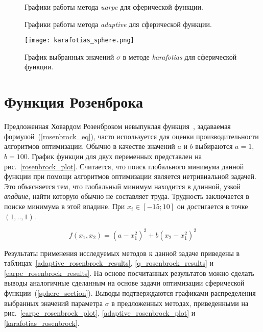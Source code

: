 \begin{figure}
  \centering
  \caption{ Графики работы метода \textit{uarpc} для сферической функции.}
  \label{uarpc_sphere_plot}
\end{figure}

\begin{figure}
  \centering
  \caption{ Графики работы метода \textit{adaptive} для сферической функции.}
  \label{adaptive_sphere_plot}
\end{figure}

\begin{figure}
  \centering
  \texttt{[image: karafotias\_sphere.png]}
  \caption{График выбранных значений $\sigma$ в методе \textit{karafotias} для сферической функции.}
  \label{karafotias_sphere}
\end{figure}


\section{Функция Розенброка}

Предложенная Ховардом Розенброком невыпуклая функция~\cite{rosenbrock}, задаваемая формулой~(\ref{rosenbrock_eq}), часто используется для оценки производительности алгоритмов оптимизации. Обычно в качестве значений $a$ и $b$ выбираются $a = 1$, $b = 100$. График функции для двух переменных представлен на рис.~\ref{rosenbrock_plot}. Считается, что поиск глобального минимума данной функции при помощи алгоритмов оптимизации является нетривиальной задачей. Это объясняется тем, что глобальный минимум находится в длинной, узкой \textit{впадине}, найти которую обычно не составляет труда. Трудность заключается в поиске минимума в этой впадине. При $x_i \in [-15; 10]$ он достигается в точке $(1,..,1)$.

\begin{equation}
\label{rosenbrock_eq}
f(x_1, x_2) = (a - x_1^2)^2 + b(x_2 - x_1^2)^2
\end{equation}

Результаты применения исследуемых методов к данной задаче приведены в таблицах~\ref{adaptive_rosenbrock_results}, \ref{q_rosenbrock_results} и \ref{earpc_rosenbrock_results}. На основе посчитанных результатов можно сделать выводы аналогичные сделанным на основе задачи оптимизации сферической функции~(\protect\ref{sphere_section}). Выводы подтверждаются графиками распределения выбранных значений параметра $\sigma$ в предложенных методах, приведенными на рис.~\ref{earpc_rosenbrock_plot}, \ref{adaptive_rosenbrock_plot} и \ref{karafotias_rosenbrock}.


